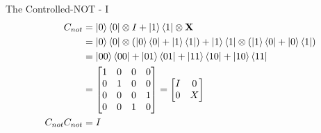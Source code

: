 \documentclass{beamer}
\begin{document}
\begin{frame}{The Controlled-NOT - I}
{\begin{align*}
      C_{not} &= \ket0\bra0 \otimes I + \ket1\bra1 \otimes \mathbf{X} \\
              &= \ket0\bra0 \otimes (\ket0\bra0 +\ket1\bra1) + \ket1\bra1 \otimes (\ket1\bra0 + \ket0\bra1) \\
              &= \ket{00}\bra{00} + \ket{01}\bra{01} + \ket{11}\bra{10} + \ket{10}\bra{11} \\
              &= \begin{bmatrix} 1 & 0 & 0 & 0 \\ 0 & 1 & 0 & 0 \\ 0 & 0 & 0 & 1 \\ 0 & 0 & 1 & 0 \end{bmatrix} 
              = \begin{bmatrix} I & 0 \\ 0 & X \end{bmatrix} \\
      C_{not}C_{not} &= I
    \end{align*}
  }%
\end{frame}
\end{document}
